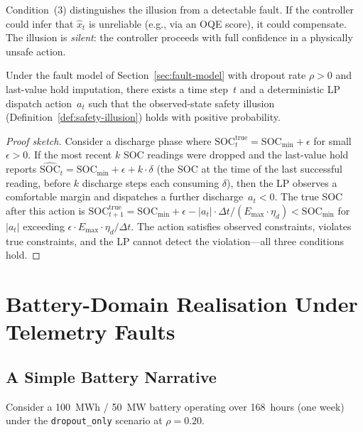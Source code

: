Condition~(3) distinguishes the illusion from a detectable fault.  If the
controller could infer that $\hat{x}_t$ is unreliable (e.g., via an OQE
score), it could compensate.  The illusion is \emph{silent}: the
controller proceeds with full confidence in a physically unsafe action.

\begin{theorem}
\label{thm:illusion-existence}
Under the fault model of Section~\ref{sec:fault-model} with dropout
rate $\rho > 0$ and last-value hold imputation, there exists a time
step~$t$ and a deterministic LP dispatch action~$a_t$ such that the
observed-state safety illusion (Definition~\ref{def:safety-illusion})
holds with positive probability.
\end{theorem}

\begin{proof}[Proof sketch]
Consider a discharge phase where
$\mathrm{SOC}_t^{\mathrm{true}} = \mathrm{SOC}_{\min} + \epsilon$ for
small $\epsilon > 0$.  If the most recent $k$ SOC readings were dropped
and the last-value hold reports
$\widehat{\mathrm{SOC}}_t = \mathrm{SOC}_{\min} + \epsilon + k \cdot
\delta$ (the SOC at the time of the last successful reading, before $k$
discharge steps each consuming $\delta$), then the LP observes a
comfortable margin and dispatches a further discharge~$a_t < 0$.  The
true SOC after this action is
$\mathrm{SOC}_{t+1}^{\mathrm{true}} = \mathrm{SOC}_{\min} + \epsilon -
|a_t| \cdot \Delta t / (E_{\max} \cdot \eta_d) < \mathrm{SOC}_{\min}$
for $|a_t|$ exceeding $\epsilon \cdot E_{\max} \cdot \eta_d / \Delta t$.
The action satisfies observed constraints, violates true constraints, and
the LP cannot detect the violation---all three conditions hold.
\end{proof}

\section{Battery-Domain Realisation Under Telemetry Faults}
\label{sec:battery-narrative}

\subsection{A Simple Battery Narrative}

Consider a 100~MWh / 50~MW battery operating over 168~hours (one week)
under the \texttt{dropout\_only} scenario at $\rho = 0.20$.

